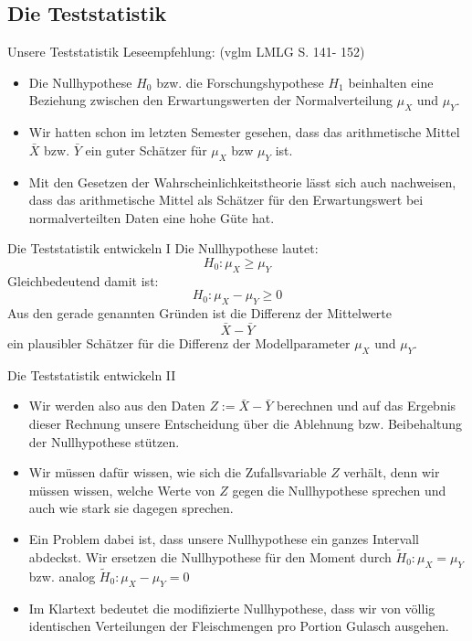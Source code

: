 \documentclass[usenames,dvipsnames,handout]{beamer}
\begin{document}
\subsection{Die Teststatistik}
\begin{frame}{Unsere  Teststatistik}
Leseempfehlung:  (vglm LMLG S. 141- 152)
\begin{itemize}
\item{Die Nullhypothese $H_{0}$ bzw. die Forschungshypothese $H_{1}$ beinhalten eine Beziehung
zwischen den Erwartungswerten der Normalverteilung $\mu_{X}$ und $\mu_{Y}.$}\pause
\item{Wir hatten schon im letzten Semester gesehen, dass das arithmetische Mittel $\bar{X}$ bzw. $\bar{Y}$
ein guter Schätzer für $\mu_{X}$ bzw $\mu_{Y}$ ist.}\pause
\item{Mit den Gesetzen der Wahrscheinlichkeitstheorie lässt sich auch nachweisen, dass das arithmetische Mittel
als Schätzer für den Erwartungswert bei normalverteilten Daten eine hohe Güte hat.}\pause
\end{itemize}
\end{frame}

\begin{frame}{Die Teststatistik entwickeln I}
Die Nullhypothese lautet: $$H_{0}:  \mu_{X} \geq \mu_{Y}$$ Gleichbedeutend damit ist: $$H_{0}:  \mu_{X} - \mu_{Y} \geq 0$$
Aus den gerade genannten Gründen ist die Differenz der Mittelwerte 
$$\bar{X}-\bar{Y}$$ ein plausibler Schätzer für die Differenz der Modellparameter $\mu_{X}$ und $\mu_{Y}$.
\end{frame}

\begin{frame}{Die Teststatistik entwickeln II}
\begin{itemize}
\item{Wir werden also aus den Daten $Z:=\bar{X}-\bar{Y}$ berechnen und auf das Ergebnis dieser Rechnung unsere Entscheidung über die Ablehnung
bzw. Beibehaltung der Nullhypothese stützen.}\pause
\item{Wir müssen dafür wissen, wie sich die Zufallsvariable $Z$ verhält, denn wir müssen wissen, welche Werte von $Z$ gegen die Nullhypothese
sprechen und auch wie stark sie dagegen sprechen.}\pause
\item{Ein Problem dabei ist, dass unsere Nullhypothese ein ganzes Intervall abdeckst. Wir ersetzen die Nullhypothese
für den Moment durch $\tilde{H}_{0}: \mu_{X} = \mu_{Y}$ bzw. analog $\tilde{H}_{0}:  \mu_{X} - \mu_{Y} = 0$}\pause
\item{Im Klartext bedeutet die modifizierte Nullhypothese, dass wir von völlig identischen Verteilungen der Fleischmengen pro Portion Gulasch ausgehen.}
\end{itemize}
\end{frame}
\end{document}

